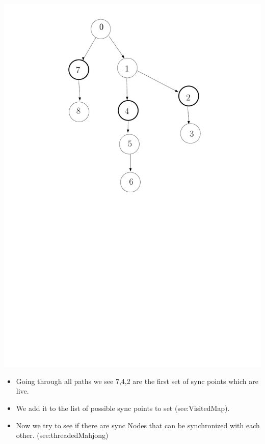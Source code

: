 \documentclass[12pt]{beamer}
\begin{document}
\begin{frame}[plain]
  \includegraphics[scale=0.3]{VisitMap.pdf}
  \begin{itemize}
  \item Going through all paths we see 7,4,2 are the first set of sync points which are live.
  \item We add it to the list of possible sync points to set (see:VisitedMap).
  \item Now we try to see if there are sync Nodes that can be synchronized with each other.
    (see:threadedMahjong)
  \end{itemize}
\end{frame}
\end{document}
